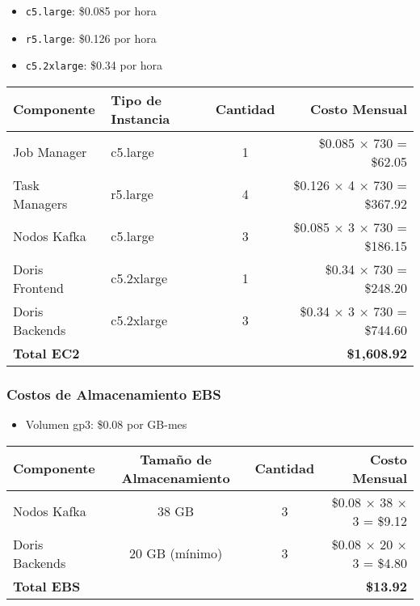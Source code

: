 \begin{itemize}
    \item \texttt{c5.large}: \$0.085 por hora
    \item \texttt{r5.large}: \$0.126 por hora
    \item \texttt{c5.2xlarge}: \$0.34 por hora
\end{itemize}

\begin{table}[h]
\centering
\begin{tabular}{|l|l|c|r|}
\hline
\textbf{Componente} & \textbf{Tipo de Instancia} & \textbf{Cantidad} & \textbf{Costo Mensual} \\
\hline
Job Manager & c5.large & 1 & \$0.085 × 730 = \$62.05 \\
\hline
Task Managers & r5.large & 4 & \$0.126 × 4 × 730 = \$367.92 \\
\hline
Nodos Kafka & c5.large & 3 & \$0.085 × 3 × 730 = \$186.15 \\
\hline
Doris Frontend & c5.2xlarge & 1 & \$0.34 × 730 = \$248.20 \\
\hline
Doris Backends & c5.2xlarge & 3 & \$0.34 × 3 × 730 = \$744.60 \\
\hline
\textbf{Total EC2} & & & \textbf{\$1,608.92} \\
\hline
\end{tabular}
\end{table}

\subsubsection{Costos de Almacenamiento EBS}

\begin{itemize}
    \item Volumen gp3: \$0.08 por GB-mes
\end{itemize}

\begin{table}[h]
\centering
\begin{tabular}{|l|c|c|r|}
\hline
\textbf{Componente} & \textbf{Tamaño de Almacenamiento} & \textbf{Cantidad} & \textbf{Costo Mensual} \\
\hline
Nodos Kafka & 38 GB & 3 & \$0.08 × 38 × 3 = \$9.12 \\
\hline
Doris Backends & 20 GB (mínimo) & 3 & \$0.08 × 20 × 3 = \$4.80 \\
\hline
\textbf{Total EBS} & & & \textbf{\$13.92} \\
\hline
\end{tabular}
\end{table}

